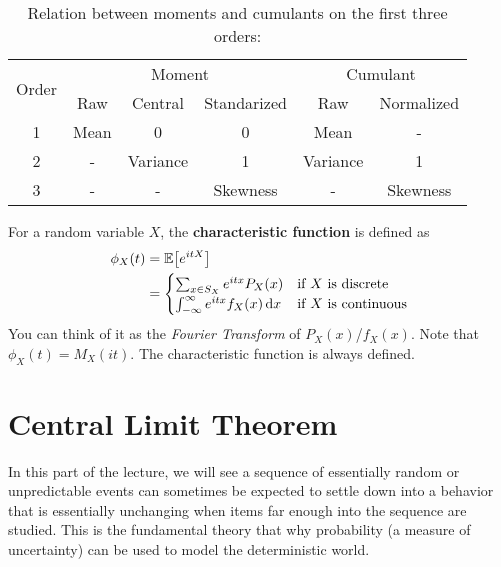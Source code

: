 \begin{table}[H]
    \centering
    \begin{tabular}{|c|ccc|cc|}
    \hline
    \multirow{2}{*}{Order} & \multicolumn{3}{c|}{Moment}                                          & \multicolumn{2}{c|}{Cumulant}            \\ \cline{2-6}
     & \multicolumn{1}{c|}{Raw} & \multicolumn{1}{c|}{Central} & Standarized & \multicolumn{1}{c|}{Raw} & Normalized \\ \hline
    1                      & \multicolumn{1}{c|}{Mean} & \multicolumn{1}{c|}{0}        & 0        & \multicolumn{1}{c|}{Mean}     & -        \\ \hline
    2                      & \multicolumn{1}{c|}{-}    & \multicolumn{1}{c|}{Variance} & 1        & \multicolumn{1}{c|}{Variance} & 1        \\ \hline
    3                      & \multicolumn{1}{c|}{-}    & \multicolumn{1}{c|}{-}        & Skewness & \multicolumn{1}{c|}{-}        & Skewness \\ \hline
    \end{tabular}
    \caption{Relation between moments and cumulants on the first three orders:}
    \label{tab:my-table}
\end{table}

\begin{definition}
    For a random variable $X$, the \textbf{characteristic function} is defined as
    \begin{align*}
        \phi_X(t)&=\E{e^{itX}}\\
        &=\begin{cases}
            \sum_{x\in S_X}e^{itx}P_X(x) & \text{if $X$ is discrete}\\
            \int_{-\infty}^{\infty}e^{itx}f_X(x)\diff x & \text{if $X$ is continuous}
        \end{cases}
    \end{align*}
    You can think of it as the \textit{Fourier Transform} of $P_X(x)$/$f_X(x)$. Note that $\phi_X(t)=M_X(it)$. The characteristic function is always defined.
\end{definition}

\section{Central Limit Theorem}\label{sec:CLT}
In this part of the lecture, we will see a sequence of essentially random or unpredictable events can sometimes be expected to settle down into a behavior that is essentially unchanging when items far enough into the sequence are studied. This is the fundamental theory that why probability (\ie a measure of uncertainty) can be used to model the deterministic world.


